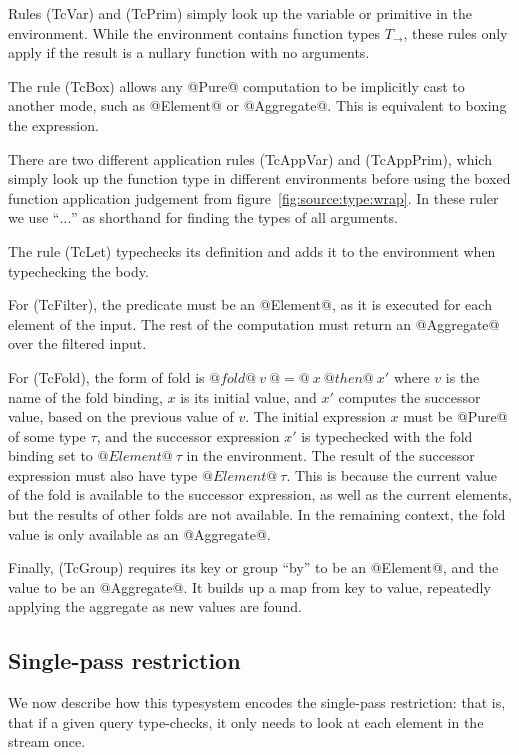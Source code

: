 Rules (TcVar) and (TcPrim) simply look up the variable or primitive in the environment.
While the environment contains function types $T_\to$, these rules only apply if the result is a nullary function with no arguments.

The rule (TcBox) allows any @Pure@ computation to be implicitly cast to another mode, such as @Element@ or @Aggregate@.
This is equivalent to boxing the expression.

There are two different application rules (TcAppVar) and (TcAppPrim), which simply look up the function type in different environments before using the boxed function application judgement from figure~\ref{fig:source:type:wrap}.
In these ruler we use ``$\ldots$'' as shorthand for finding the types of all arguments.

The rule (TcLet) typechecks its definition and adds it to the environment when typechecking the body.

For (TcFilter), the predicate must be an @Element@, as it is executed for each element of the input.
The rest of the computation must return an @Aggregate@ over the filtered input.

For (TcFold), the form of fold is $@fold@~v~@=@~x~@then@~x'$ where $v$ is the name of the fold binding, $x$ is its initial value, and $x'$ computes the successor value, based on the previous value of $v$.
The initial expression $x$ must be @Pure@ of some type $\tau$, and the successor expression $x'$ is typechecked with the fold binding set to $@Element@~\tau$ in the environment.
The result of the successor expression must also have type $@Element@~\tau$.
This is because the current value of the fold is available to the successor expression, as well as the current elements, but the results of other folds are not available.
In the remaining context, the fold value is only available as an @Aggregate@.

Finally, (TcGroup) requires its key or group ``by'' to be an @Element@, and the value to be an @Aggregate@.
It builds up a map from key to value, repeatedly applying the aggregate as new values are found.

\subsection{Single-pass restriction}

We now describe how this typesystem encodes the single-pass restriction: that is, that if a given query type-checks, it only needs to look at each element in the stream once.

